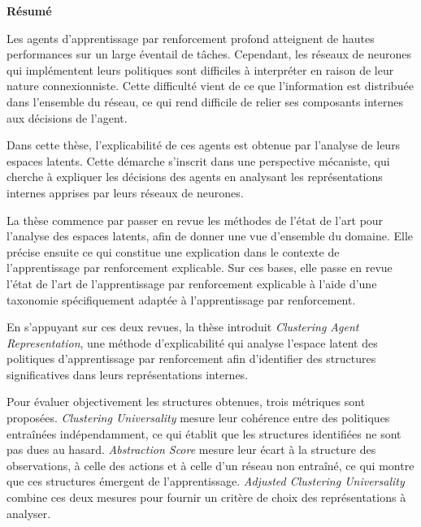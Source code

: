 \cleartorightpage
\centeredmargins
{}
\thispagestyle{empty}
\nolinenumbers
\label{chap:french_back_cover}
\begin{center}
  {\LARGE\bfseries \ThesisTitle\par}
  \medskip
  {\large \ThesisAuthor\par}
\end{center}
\bigskip
\noindent\textbf{Résumé}

Les agents d'apprentissage par renforcement profond atteignent de hautes performances sur un large éventail de tâches.
Cependant, les réseaux de neurones qui implémentent leurs politiques sont difficiles à interpréter en raison de leur nature connexionniste.
Cette difficulté vient de ce que l'information est distribuée dans l'ensemble du réseau, ce qui rend difficile de relier ses composants internes aux décisions de l'agent.

Dans cette thèse, l'explicabilité de ces agents est obtenue par l'analyse de leurs espaces latents.
Cette démarche s'inscrit dans une perspective mécaniste, qui cherche à expliquer les décisions des agents en analysant les représentations internes apprises par leurs réseaux de neurones.

La thèse commence par passer en revue les méthodes de l'état de l'art pour l'analyse des espaces latents, afin de donner une vue d'ensemble du domaine.
Elle précise ensuite ce qui constitue une explication dans le contexte de l'apprentissage par renforcement explicable.
Sur ces bases, elle passe en revue l'état de l'art de l'apprentissage par renforcement explicable à l'aide d'une taxonomie spécifiquement adaptée à l'apprentissage par renforcement.

En s'appuyant sur ces deux revues, la thèse introduit \textit{Clustering Agent Representation}, une méthode d'explicabilité qui analyse l'espace latent des politiques d'apprentissage par renforcement afin d'identifier des structures significatives dans leurs représentations internes.

Pour évaluer objectivement les structures obtenues, trois métriques sont proposées.
\textit{Clustering Universality} mesure leur cohérence entre des politiques entraînées indépendamment, ce qui établit que les structures identifiées ne sont pas dues au hasard.
\textit{Abstraction Score} mesure leur écart à la structure des observations, à celle des actions et à celle d'un réseau non entraîné, ce qui montre que ces structures émergent de l'apprentissage.
\textit{Adjusted Clustering Universality} combine ces deux mesures pour fournir un critère de choix des représentations à analyser.


